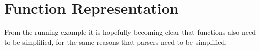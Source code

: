 \documentclass[../../main.tex]{subfiles}
\begin{document}

\section{Function Representation}\label{sec:function-representation}
From the running example it is hopefully becoming clear that functions also need to be simplified, for the same reasons that parsers need to be simplified.
\end{document}
